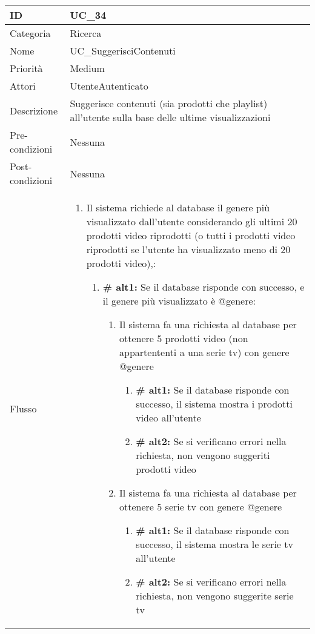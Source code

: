 \begin{center}
\begin{tabular}{ |p{2cm}|p{13cm}|  }
\hline
ID & UC\_34 \\\hline
Categoria & Ricerca \\\hline
Nome & UC\_SuggerisciContenuti\\\hline
Priorità & Medium \\\hline
Attori &  UtenteAutenticato \\\hline
Descrizione & Suggerisce contenuti (sia prodotti che playlist) all'utente sulla base delle ultime visualizzazioni\\\hline
Pre-condizioni &  Nessuna\\\hline
Post-condizioni &  Nessuna\\\hline
Flusso &  	\begin{enumerate}
		\item Il sistema richiede al database il genere più visualizzato dall'utente considerando gli ultimi 20 prodotti video riprodotti (o tutti i prodotti video riprodotti se l'utente ha visualizzato meno di 20 prodotti video),:
		\begin{enumerate}[label*=\arabic*.]
			\item \textbf{\# alt1:} Se il database risponde con successo, e il genere più visualizzato è @genere:
			\begin{enumerate}[label*=\arabic*.]
			\item Il sistema fa una richiesta al database per ottenere 5 prodotti video (non appartententi a una serie tv) con genere @genere
				\begin{enumerate}[label*=\arabic*.]
					\item \textbf{\# alt1:} Se il database risponde con successo, il sistema mostra i prodotti video all'utente
					\item \textbf{\# alt2:} Se si verificano errori nella richiesta, non vengono suggeriti prodotti video
				\end{enumerate}
			\item Il sistema fa una richiesta al database per ottenere 5 serie tv con genere @genere
				\begin{enumerate}[label*=\arabic*.]
					\item \textbf{\# alt1:} Se il database risponde con successo, il sistema mostra le serie tv all'utente
					\item \textbf{\# alt2:} Se si verificano errori nella richiesta, non vengono suggerite serie tv
				\end{enumerate}
			\end{enumerate}

\end{enumerate}
\end{enumerate}
\end{tabular}
\end{center}
